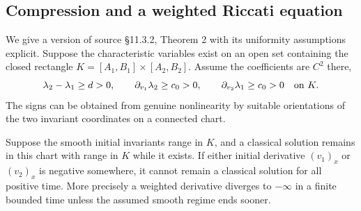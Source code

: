 \subsection{Compression and a weighted Riccati equation}
We give a version of source \S11.3.2, Theorem 2 with its uniformity
assumptions explicit. Suppose the characteristic variables exist on
an open set containing the closed rectangle
$K=[A_1,B_1]\times[A_2,B_2]$. Assume the coefficients are $C^2$ there,
\begin{equation}\label{eq:11-blowup-assumptions}
 \lambda_2-\lambda_1\ge d>0,\qquad
 \partial_{v_1}\lambda_2\ge c_0>0,\qquad
 \partial_{v_2}\lambda_1\ge c_0>0 \quad\hbox{on }K.
\end{equation}
The signs can be obtained from genuine nonlinearity by suitable
orientations of the two invariant coordinates on a connected chart.
\begin{theorem}
Suppose the smooth initial invariants range in $K$, and a classical
solution remains in this chart with range in $K$ while it exists.
If either initial derivative $(v_1)_x$ or $(v_2)_x$ is negative
somewhere, it cannot remain a classical solution for all positive time.
More precisely a weighted derivative diverges to $-\infty$ in a
finite bounded time unless the assumed smooth regime ends sooner.
\end{theorem}
